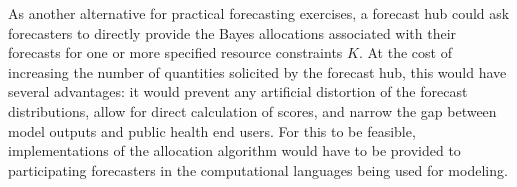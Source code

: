 \documentclass{article}\usepackage[]{graphicx}\usepackage[]{xcolor}
\begin{document}
As another alternative for practical forecasting exercises, a forecast hub could ask forecasters to directly provide the Bayes allocations associated with their forecasts for one or more specified resource constraints $K$. At the cost of increasing the number of quantities solicited by the forecast hub, this would have several advantages: it would prevent any artificial distortion of the forecast distributions, allow for direct calculation of scores, and narrow the gap between model outputs and public health end users. For this to be feasible, implementations of the allocation algorithm would have to be provided to participating forecasters in the computational languages being used for modeling.


\end{document}
